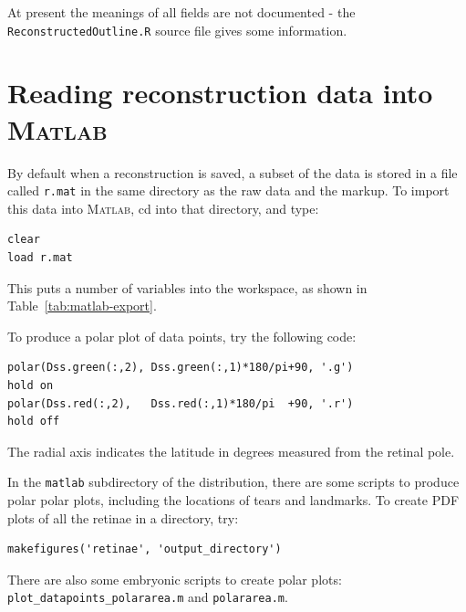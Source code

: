 \documentclass{book}
\begin{document}
At present the meanings of all fields are not documented - the 
\texttt{ReconstructedOutline.R} source file gives some information.



\section{Reading reconstruction data into \textsc{Matlab}}
\label{retistruct-manual:sec:export-reconstr-data}

By default when a reconstruction is saved, a subset of the data is
stored in a file called \texttt{r.mat} in the same directory as the
raw data and the markup. To import this data into \textsc{Matlab}, cd
into that directory, and type:
\begin{verbatim}
clear
load r.mat
\end{verbatim}
This puts a number of variables into the workspace, as shown in
Table~\ref{tab:matlab-export}.

To produce a polar plot of data points, try the following code:
\begin{verbatim}
polar(Dss.green(:,2), Dss.green(:,1)*180/pi+90, '.g')
hold on
polar(Dss.red(:,2),   Dss.red(:,1)*180/pi  +90, '.r')
hold off
\end{verbatim}
The radial axis indicates the latitude in degrees measured from the
retinal pole.

In the \texttt{matlab} subdirectory of the distribution, there are
some scripts to produce polar polar plots, including the locations of
tears and landmarks. To create PDF plots of all the retinae in a
directory, try:
\begin{verbatim}
makefigures('retinae', 'output_directory')
\end{verbatim}

There are also some embryonic scripts to create polar plots:
\texttt{plot\_datapoints\_polararea.m} and \texttt{polararea.m}.
\end{document}
